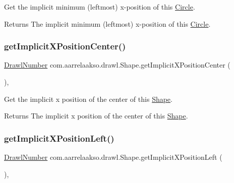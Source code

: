 Get the implicit minimum (leftmost) x-\/position of this \hyperlink{classcom_1_1aarrelaakso_1_1drawl_1_1_circle}{Circle}. 

\begin{DoxyReturn}{Returns}
The implicit minimum (leftmost) x-\/position of this \hyperlink{classcom_1_1aarrelaakso_1_1drawl_1_1_circle}{Circle}. 
\end{DoxyReturn}
\mbox{\label{classcom_1_1aarrelaakso_1_1drawl_1_1_shape_ac7a69f5cb9dd954f5054a3bebc35af41}} 
\subsubsection{\texorpdfstring{get\+Implicit\+X\+Position\+Center()}{getImplicitXPositionCenter()}}
{\footnotesize\ttfamily \hyperlink{classcom_1_1aarrelaakso_1_1drawl_1_1_drawl_number}{Drawl\+Number} com.\+aarrelaakso.\+drawl.\+Shape.\+get\+Implicit\+X\+Position\+Center (\begin{DoxyParamCaption}{ }\end{DoxyParamCaption})\hspace{0.3cm}{\ttfamily [protected]}, {\ttfamily [inherited]}}



Get the implicit x position of the center of this \hyperlink{classcom_1_1aarrelaakso_1_1drawl_1_1_shape}{Shape}. 

\begin{DoxyReturn}{Returns}
The implicit x position of the center of this \hyperlink{classcom_1_1aarrelaakso_1_1drawl_1_1_shape}{Shape}. 
\end{DoxyReturn}
\mbox{\label{classcom_1_1aarrelaakso_1_1drawl_1_1_shape_a3cc59779e8ce4a98ff2309e0fb414527}} 
\subsubsection{\texorpdfstring{get\+Implicit\+X\+Position\+Left()}{getImplicitXPositionLeft()}}
{\footnotesize\ttfamily \hyperlink{classcom_1_1aarrelaakso_1_1drawl_1_1_drawl_number}{Drawl\+Number} com.\+aarrelaakso.\+drawl.\+Shape.\+get\+Implicit\+X\+Position\+Left (\begin{DoxyParamCaption}{ }\end{DoxyParamCaption})\hspace{0.3cm}{\ttfamily [protected]}, {\ttfamily [inherited]}}




